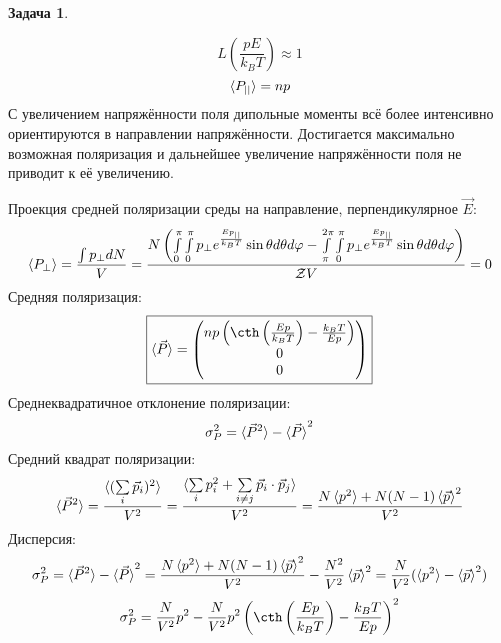 \documentclass[12pt]{article}
\theoremstyle{definition}
\newtheorem{zad}{Задача}[section]
\begin{document}
\begin{zad}
\begin{enumerate}
\begin{equation}
    L\left(\frac{pE}{k_BT}\right)\approx 1
\end{equation}
\begin{equation}
    \braket{P_{||}}=np
\end{equation}
С увеличением напряжённости поля дипольные моменты всё более интенсивно ориентируются в направлении напряжённости. Достигается максимально возможная поляризация и дальнейшее увеличение напряжённости поля не приводит к её увеличению.
\end{enumerate}
Проекция средней поляризации среды на направление, перпендикулярное $\vec{E}$:
\begin{equation}\label{eq5}
    \braket{P_\perp}=\frac{\int p_\perp dN}{V}=\frac{N\left(\int\limits_0^{\pi}\int\limits_0^\pi p_\perp e^{\frac{Ep_{||}}{k_BT}}\sin\theta d\theta d\varphi-\int\limits_\pi^{2\pi}\int\limits_0^\pi p_\perp e^{\frac{Ep_{||}}{k_BT}}\sin\theta d\theta d\varphi\right)}{\mathcal{Z}V}=0
\end{equation}
Средняя поляризация:
\begin{equation}
    \boxed{\braket{\vec{P}}=\begin{pmatrix}
        np\left(\cth\left(\frac{Ep}{k_BT}\right)-\frac{k_BT}{Ep}\right)\\
        0\\
        0
    \end{pmatrix}}
\end{equation}
Среднеквадратичное отклонение поляризации:
\begin{equation}
    \sigma_P^2=\braket{\vec{P}^2}-\braket{\vec{P}}^2
\end{equation}
Средний квадрат поляризации:
\begin{equation}
    \braket{\vec{P}^2}=\frac{\braket{(\sum\limits_i\vec{p}_i)^2}}{V^2}=\frac{\braket{\sum\limits_i p_i^2+\sum\limits_{i\neq j}\vec{p}_i\cdot\vec{p}_j}}{V^2}=\frac{N\braket{p^2}+N(N-1)\braket{\vec{p}}^2}{V^2}
\end{equation}
Дисперсия:
\begin{equation}
    \sigma_P^2=\braket{\vec{P}^2}-\braket{\vec{P}}^2=\frac{N\braket{p^2}+N(N-1)\braket{\vec{p}}^2}{V^2}-\frac{N^2}{V^2}\braket{\vec{p}}^2=\frac{N}{V^2}(\braket{p^2}-\braket{\vec{p}}^2)
\end{equation}
\begin{equation}
    \sigma_P^2=\frac{N}{V^2}p^2-\frac{N}{V^2}p^2\left(\cth\left(\frac{Ep}{k_BT}\right)-\frac{k_BT}{Ep}\right)^2
\end{equation}

\end{zad}
\end{document}

